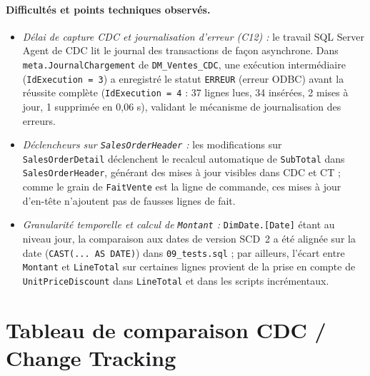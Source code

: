 \documentclass[9pt,a4paper]{article}
\begin{document}
\paragraph{Difficultés et points techniques observés.}
\begin{itemize}
  \item \emph{Délai de capture CDC et journalisation d'erreur (C12) :} le travail SQL Server Agent de CDC lit le journal des transactions de façon asynchrone. Dans \texttt{meta.JournalChargement} de \texttt{DM\_Ventes\_CDC}, une exécution intermédiaire (\texttt{IdExecution = 3}) a enregistré le statut \texttt{ERREUR} (erreur ODBC) avant la réussite complète (\texttt{IdExecution = 4} : 37 lignes lues, 34 insérées, 2 mises à jour, 1 supprimée en 0,06 s), validant le mécanisme de journalisation des erreurs.
  \item \emph{Déclencheurs sur \texttt{SalesOrderHeader} :} les modifications sur \texttt{SalesOrderDetail} déclenchent le recalcul automatique de \texttt{SubTotal} dans \texttt{SalesOrderHeader}, générant des mises à jour visibles dans CDC et CT ; comme le grain de \texttt{FaitVente} est la ligne de commande, ces mises à jour d'en-tête n'ajoutent pas de fausses lignes de fait.
  \item \emph{Granularité temporelle et calcul de \texttt{Montant} :} \texttt{DimDate.[Date]} étant au niveau jour, la comparaison aux dates de version SCD~2 a été alignée sur la date (\texttt{CAST(... AS DATE)}) dans \texttt{09\_tests.sql} ; par ailleurs, l'écart entre \texttt{Montant} et \texttt{LineTotal} sur certaines lignes provient de la prise en compte de \texttt{UnitPriceDiscount} dans \texttt{LineTotal} et dans les scripts incrémentaux.
\end{itemize}

\section{Tableau de comparaison CDC / Change Tracking}
\end{document}
